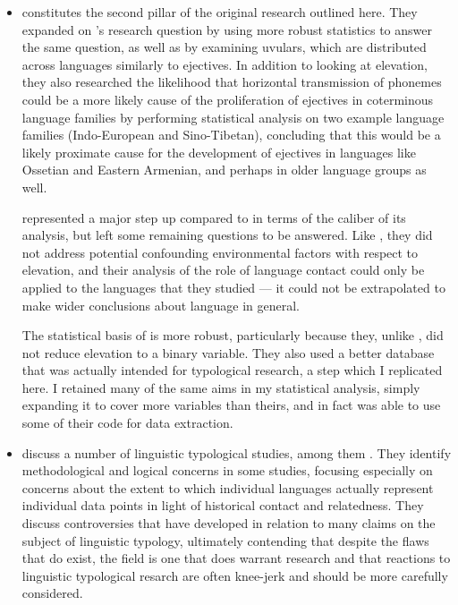 \documentclass{article}
\begin{document}
\begin{itemize}
\item \textbf{}

\textcite{urban2021} constitutes the second pillar of the original research outlined here. They expanded on \textcite{everett2013}'s research question by using more robust statistics to answer the same question, as well as by examining uvulars, which are distributed across languages similarly to ejectives. In addition to looking at elevation, they also researched the likelihood that horizontal transmission of phonemes could be a more likely cause of the proliferation of ejectives in coterminous language families by performing statistical analysis on two example language families (Indo-European and Sino-Tibetan), concluding that this would be a likely proximate cause for the development of ejectives in languages like Ossetian and Eastern Armenian, and perhaps in older language groups as well.

\textcite{urban2021} represented a major step up compared to \textcite{everett2013} in terms of the caliber of its analysis, but left some remaining questions to be answered. Like \textcite{everett2013}, they did not address potential confounding environmental factors with respect to elevation, and their analysis of the role of language contact could only be applied to the languages that they studied --- it could not be extrapolated to make wider conclusions about language in general. 

The statistical basis of \textcite{urban2021} is more robust, particularly because they, unlike \textcite{everett2013}, did not reduce elevation to a binary variable. They also used a better database that was actually intended for typological research, a step which I replicated here. I retained many of the same aims in my statistical analysis, simply expanding it to cover more variables than theirs, and in fact was able to use some of their code for data extraction.

\item \textbf{}

\textcite{ladd2015} discuss a number of linguistic typological studies, among them \textcite{everett2013}. They identify methodological and logical concerns in some studies, focusing especially on concerns about the extent to which individual languages actually represent individual data points in light of historical contact and relatedness. They discuss controversies that have developed in relation to many claims on the subject of linguistic typology, ultimately contending that despite the flaws that do exist, the field is one that does warrant research and that reactions to linguistic typological resarch are often knee-jerk and should be more carefully considered. 


\end{itemize}
\end{document}
